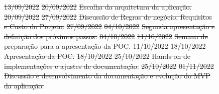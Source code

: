 \documentclass[
    12pt,               %
    openright,          %
    oneside,
    a4paper,            %
    BIBLATEX,           %
    TODO,               %
    english,            %
    brazil              %
    ]{ifsp-spo-inf-ctds}
\providecommand{\DIFdel}[1]{{\protect\color{red}\sout{#1}}}                      %
\providecommand{\DIFaddbegin}{} %
\providecommand{\DIFaddend}{} %
\providecommand{\DIFdelbegin}{} %
\providecommand{\DIFdelend}{} %
\providecommand{\DIFdelFL}[1]{\DIFdel{#1}} %
\providecommand{\DIFaddbeginFL}{} %
\providecommand{\DIFdelendFL}{} %
\newcommand{\DIFscaledelfig}{0.5}
\newlength{\DIFdelgraphicswidth} %
\newlength{\DIFdelgraphicsheight} %
\newcommand{\DIFaddincludegraphics}[2][]{{\color{blue}\fbox{\DIFOincludegraphics[#1]{#2}}}} %
\newcommand{\DIFdelincludegraphics}[2][]{%
\sbox{\DIFdelgraphicsbox}{\DIFOincludegraphics[#1]{#2}}%
\settoboxwidth{\DIFdelgraphicswidth}{\DIFdelgraphicsbox} %
\settoboxtotalheight{\DIFdelgraphicsheight}{\DIFdelgraphicsbox} %
\scalebox{\DIFscaledelfig}{%
\parbox[b]{\DIFdelgraphicswidth}{\usebox{\DIFdelgraphicsbox}\\[-\baselineskip] \rule{\DIFdelgraphicswidth}{0em}}\llap{\resizebox{\DIFdelgraphicswidth}{\DIFdelgraphicsheight}{%
\setlength{\unitlength}{\DIFdelgraphicswidth}%
\begin{picture}(1,1)%
\thicklines\linethickness{2pt} %
{\color[rgb]{1,0,0}\put(0,0){\framebox(1,1){}}}%
{\color[rgb]{1,0,0}\put(0,0){\line( 1,1){1}}}%
{\color[rgb]{1,0,0}\put(0,1){\line(1,-1){1}}}%
\end{picture}%
}\hspace*{3pt}}} %
} %
\DeclareRobustCommand{\DIFaddbegin}{\DIFOaddbegin \let\includegraphics\DIFaddincludegraphics} %
\DeclareRobustCommand{\DIFaddend}{\DIFOaddend \let\includegraphics\DIFOincludegraphics} %
\DeclareRobustCommand{\DIFdelbegin}{\DIFOdelbegin \let\includegraphics\DIFdelincludegraphics} %
\DeclareRobustCommand{\DIFdelend}{\DIFOaddend \let\includegraphics\DIFOincludegraphics} %
\DeclareRobustCommand{\DIFaddbeginFL}{\DIFOaddbeginFL \let\includegraphics\DIFaddincludegraphics} %
\DeclareRobustCommand{\DIFdelendFL}{\DIFOaddendFL \let\includegraphics\DIFOincludegraphics} %
\begin{document}
\begin{figure}[htb!]
\DIFdelFL{13/09/2022 }%
\DIFdelFL{20/09/2022 }%
\DIFdelFL{Escolha da arquitetura da aplicação.}%
\DIFdelFL{20/09/2022 }%
\DIFdelFL{27/09/2022 }%
\DIFdelFL{Discussão de Regras de negócio, Requisitos e Custo do Projeto. }%
\DIFdelFL{27/09/2022 }%
\DIFdelFL{04/10/2022 }%
\DIFdelFL{Segunda apresentação e definição dos próximos passos. }%
\DIFdelFL{04/10/2022 }%
\DIFdelFL{11/10/2022 }%
\DIFdelFL{Semana de preparação para a apresentação da POC. }%
\DIFdelFL{11/10/2022 }%
\DIFdelFL{18/10/2022 }%
\DIFdelFL{Apresentação da POC. }%
\DIFdelFL{18/10/2022 }%
\DIFdelFL{25/10/2022 }%
\DIFdelFL{Hands on de implementações e ajustes de documentação.}%
\DIFdelFL{25/10/2022 }%
\DIFdelFL{01/11/2022 }%
\DIFdelFL{Discussão e desenvolvimento da documentação e evolução do MVP da aplicação. }%
\DIFdelendFL \DIFaddbeginFL \label{fig:svn}
    \end{figure}
\DIFaddend 

\DIFdelbegin %
\DIFdelend %
\DIFaddbegin 


\postextual





\DIFaddend 
\end{document}
